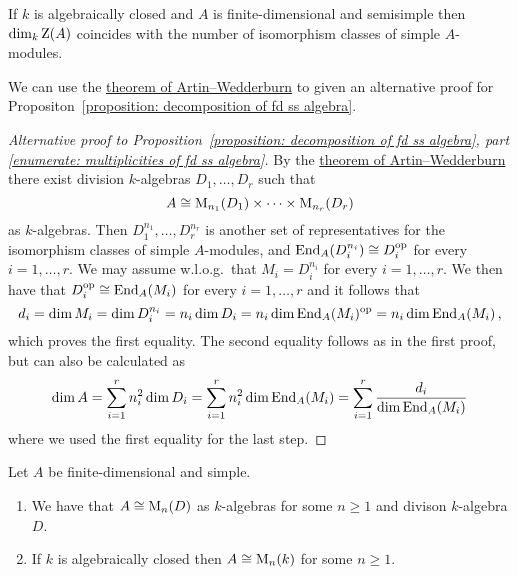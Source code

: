 \begin{corollary}
  \label{corollary: dimension of center is number of simple modules}
  If $k$ is algebraically closed and $A$ is finite-dimensional and semisimple then $\dim_k \operatorname{Z}(A)$ coincides with the number of isomorphism classes of simple $A$-modules.
\end{corollary}




\begin{fluff}
  We can use the \hyperref[theorem: artin wedderburn theorem]{theorem of Artin--Wedderburn} to given an alternative proof for Propositon~\ref{proposition: decomposition of fd ss algebra}.
\end{fluff}


\begin{proof}[Alternative proof to Proposition~\ref*{proposition: decomposition of fd ss algebra}, part \ref*{enumerate: multiplicities of fd ss algebra}]
  By the \hyperref[theorem: artin wedderburn theorem]{theorem of Artin--Wedderburn} there exist division $k$-algebras $D_1, \dotsc, D_r$ such that
  \[
          A
    \cong \operatorname{M}_{n_1}(D_1) \times \dotsb \times \operatorname{M}_{n_r}(D_r)
  \]
  as $k$-algebras.
  Then $D_1^{n_1}, \dotsc, D_r^{n_r}$ is another set of representatives for the isomorphism classes of simple $A$-modules, and $\operatorname{End}_A(D_i^{n_i}) \cong D_i^{\operatorname{op}}$ for every $i = 1, \dotsc, r$.
  We may assume w.l.o.g.\ that $M_i = D_i^{n_i}$ for every $i = 1, \dotsc, r$.
  We then have that $D_i^{\operatorname{op}} \cong \operatorname{End}_A(M_i)$ for every $i = 1, \dotsc, r$ and it follows that
  \[
      d_i
    = \dim M_i
    = \dim D_i^{n_i}
    = n_i \dim D_i
    = n_i \dim \operatorname{End}_A(M_i)^{\operatorname{op}}
    = n_i \dim \operatorname{End}_A(M_i) \,,
  \]
  which proves the first equality.
  The second equality follows as in the first proof, but can also be calculated as
  \[
      \dim A
    = \sum_{i=1}^r n_i^2 \dim D_i
    = \sum_{i=1}^r n_i^2 \dim \operatorname{End}_A(M_i)
    = \sum_{i=1}^r \frac{d_i}{\dim \operatorname{End}_A(M_i)}
  \]
  where we used the first equality for the last step.
\end{proof}




\begin{corollary}[Wedderburn]
  \label{corollary: wedderburn for algebras}
  Let $A$ be finite-dimensional and simple.
  \begin{enumerate}
    \item
      We have that $A \cong \operatorname{M}_n(D)$ as $k$-algebras for some $n \geq 1$ and divison $k$-algebra $D$.
    \item
      If $k$ is algebraically closed then $A \cong \operatorname{M}_n(k)$ for some $n \geq 1$.
  \end{enumerate}
\end{corollary}


